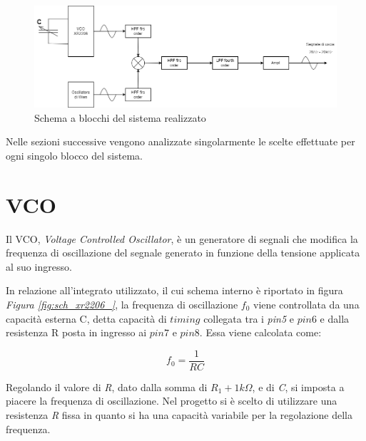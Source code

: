 \documentclass[titlepage]{report}
\begin{document}
	\begin{figure}[h]
		\centering
		\includegraphics[scale=0.5]{Immagini/Schema a blocchi PSEA.png}
		\caption{Schema a blocchi del sistema realizzato}
		\label{fig: Schema a blocchi finale}
	\end{figure}
\space
	\noindent Nelle sezioni successive vengono analizzate singolarmente le scelte effettuate per ogni singolo blocco del sistema.
	 
\section{VCO}

	Il VCO, \textit{Voltage Controlled Oscillator}, è un generatore di segnali che modifica la frequenza di oscillazione del segnale generato in funzione della tensione applicata al suo ingresso.
	
	\noindent In relazione all'integrato utilizzato, il cui schema interno è riportato in figura \textit{Figura \ref{fig:sch_xr2206_}}, la frequenza di oscillazione $f_0$ viene controllata da una capacità esterna C, detta capacità di $timing$ collegata tra i \textit{pin5} e $pin6$ e dalla resistenza R posta in ingresso ai $pin7$ e $pin8$. Essa viene calcolata come:
	
	\begin{equation}
		\label{eq:freq_operation}
		f_0 = \frac{1}{RC} 
	\end{equation}

	\noindent Regolando il valore di \textit{R}, dato dalla somma di $R_1 + 1k\Omega$, e di \textit{C}, si imposta a piacere la frequenza di oscillazione.
	Nel progetto si è scelto di utilizzare una resistenza \textit{R} fissa in quanto si ha una capacità variabile per la regolazione della frequenza.
\end{document}
